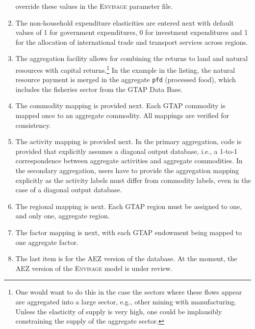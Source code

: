 \begin{enumerate}
override these values in the \textsc{Envisage} parameter file.
\item The non-household expenditure elasticities are entered next with
default values of 1 for government expenditures, 0 for investment expenditures
and 1 for the allocation of international trade and transport services across
regions.
\item The aggregation facility allows for combining the returns to
land and natural resources with capital returns.\footnote{One would want to
do this in the case the sectors where these flows appear are aggregated
into a large sector, e.g., other mining with manufacturing. Unless
the elasticity of supply is very high, one could be implausibly constraining the
supply of the aggregate sector.} In the example in the listing, the
natural resource payment is merged in the aggregate \texttt{pfd} (processed food),
which includes the fisheries sector from the GTAP Data Base.
\item The commodity mapping is provided next. Each GTAP commodity is
mapped once to an aggregate commodity. All mappings are verified for
consistency.
\item The activity mapping is provided next. In the primary aggregation,
code is provided that explicitly assumes a diagonal output database, i.e.,
a 1-to-1 correspondence between aggregate activities and aggregate commodities.
In the secondary aggregation, users have to provide the aggregation
mapping explicitly as the activity labels must differ from commodity
labels, even in the case of a diagonal output database.
\item The regional mapping is next. Each GTAP region must be assigned
to one, and only one, aggregate region.
\item The factor mapping is next, with each GTAP endowment being
mapped to one aggregate factor.
\item The last item is for the AEZ version of the database. At the moment,
the AEZ version of the \textsc{Envisage} model is under review.
\end{enumerate}

